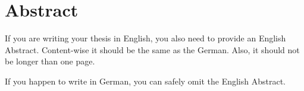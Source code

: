 \chapter*{Abstract}

If you are writing your thesis in English, you also need to provide an English Abstract.
Content-wise it should be the same as the German. 
Also, it should not be longer than one page.

If you happen to write in German, you can safely omit the English Abstract.
